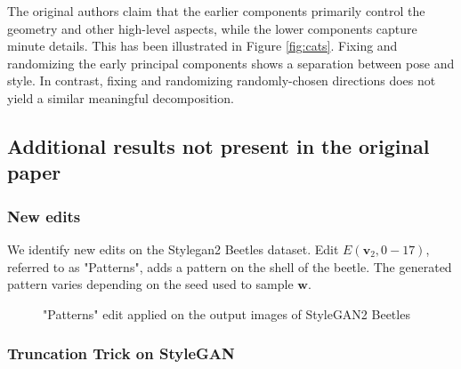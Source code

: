 The original authors claim that the earlier components primarily control the geometry and other high-level aspects, while the lower components capture minute details. This has been illustrated in Figure \ref{fig:cats}. Fixing and randomizing the early principal components shows a separation between pose and style. In contrast, fixing and randomizing randomly-chosen directions does not yield a similar meaningful decomposition.

\subsection{Additional results not present in the original paper}

\subsubsection{New edits}

We identify new edits on the Stylegan2 Beetles dataset. Edit $E(\textbf{v}_{2}, 0-17)$, referred to as "Patterns", adds a pattern on the shell of the beetle. The generated pattern varies depending on the seed used to sample $\textbf{w}$.

\begin{figure}[H]



\caption{"Patterns" edit applied on the output images of StyleGAN2 Beetles}

\end{figure}

\subsubsection{Truncation Trick on StyleGAN}

